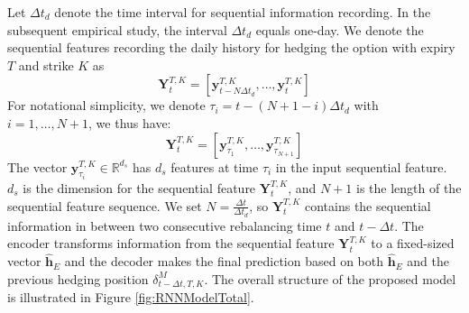 \documentclass[letterpaper,12pt,titlepage,oneside,final]{book}
\numberwithin{equation}{section}
\theoremstyle{definition}
\newcommand{\vy}{\mathbf{y}}
\newcommand{\DT}{\Delta t}
\newcommand{\Real}{\mathbb{R}}
\begin{document}
Let $\DT_{d}$ denote the time interval for sequential information recording. In  the subsequent empirical study, the interval $\DT_{d}$ equals one-day.  We denote the sequential features recording the daily history for hedging the option with expiry $T$ and strike $K$ as
\[
\mathbf{Y}_{t}^{T,K}=\left[\vy^{T,K}_{t-N \DT_{d}},\dots,\vy^{T,K}_{t}\right]
\]
For notational simplicity, we denote $\tau_i=t-(N+1-i)\DT_d$ with $i=1, \dots,N+1$, we thus have:
\[
\mathbf{Y}_{t}^{T,K}=\left[\vy^{T,K}_{\tau_{1}},\dots,\vy^{T,K}_{\tau_{N+1}}\right]
\]
The vector $\vy^{T,K}_{\tau_{i}} \in \Real^{d_s}$ has  $d_s$ features at time $\tau_{i}$ in the input sequential feature.
 $d_s$ is the dimension for the sequential feature $\mathbf{Y}_{t}^{T,K}$, and
$N+1$ is the length of the sequential feature sequence. We set $N=\frac{\Delta t}{\Delta t_d}$, so $\mathbf{Y}_{t}^{T,K}$ contains the sequential information in between two consecutive rebalancing time $t$ and $t-\Delta t$.
The encoder transforms information from the sequential feature $\mathbf{Y}_{t}^{T,K}$ to  a fixed-sized vector
$\mathbf{\widehat{h}}_E$   and the decoder makes the final prediction based on both $\mathbf{\widehat{h}}_E$  and the previous hedging position $\delta^{M}_{t-\Delta t,T,K}$. The overall structure of the proposed model is illustrated in Figure \ref{fig:RNNModelTotal}. 
\end{document}
